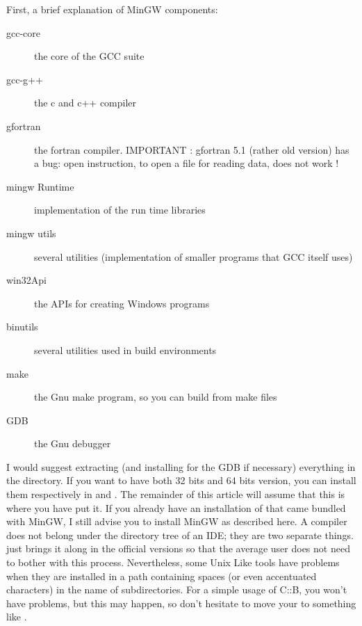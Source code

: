 
First, a brief explanation of MinGW components:

\begin{description}
\item[gcc-core] the core of the GCC suite
\item[gcc-g++] the c and c++ compiler
\item[gfortran] the fortran compiler. IMPORTANT : gfortran 5.1 (rather old version) has a bug: open instruction, to open a file for reading data, does not work !
\item[mingw Runtime] implementation of the run time libraries
\item[mingw utils] several utilities (implementation of smaller programs that GCC itself uses)
\item[win32Api] the APIs for creating Windows programs
\item[binutils] several utilities used in build environments
\item[make] the Gnu make program, so you can build from make files
\item[GDB] the Gnu debugger
\end{description}

I would suggest extracting (and installing for the GDB if necessary) everything in the  directory. If you want to have both 32 bits and 64 bits version, you can install them respectively in  and . The remainder of this article will assume that this is where you have put it. If you already have an installation of \codeblocks that came bundled with MinGW, I still advise you to install MinGW as described here. A compiler does not belong under the directory tree of an IDE; they are two separate things. \codeblocks just brings it along in the official versions so that the average user does not need to bother with this process. Nevertheless, some Unix Like tools have problems when they are installed in a path containing spaces (or even accentuated characters) in the name of subdirectories. For a simple usage of C::B, you won't have problems, but this may happen, so don't hesitate to move your  to something like .

